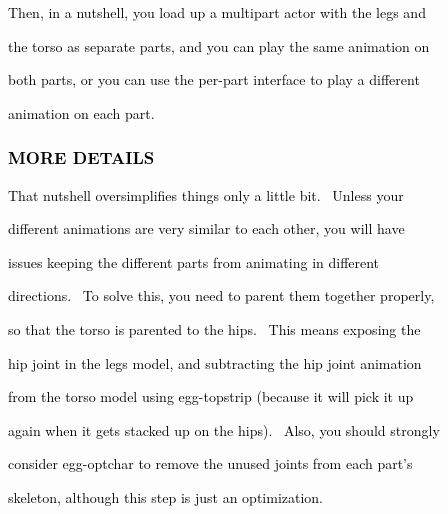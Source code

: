 \documentclass[a4paper]{article}
\newcommand\textstyleOOoComputerKeyWord[1]{\textrm{\textcolor[rgb]{0.0,0.0,0.5019608}{#1}}}
\begin{document}
{\color{black}
\textstyleOOoComputerKeyWord{\textcolor{black}{Then, in a nutshell, you load up a multipart actor with the legs and}}}

{\color{black}
\textstyleOOoComputerKeyWord{\textcolor{black}{the torso as separate parts, and you can play the same animation on}}}

{\color{black}
\textstyleOOoComputerKeyWord{\textcolor{black}{both parts, or you can use the per-part interface to play a different}}}

{\color{black}
\textstyleOOoComputerKeyWord{\textcolor{black}{animation on each part.}}}


\bigskip

\clearpage\subsubsection[MORE DETAILS]{\textstyleOOoComputerKeyWord{\textcolor{black}{MORE DETAILS}}}
\hypertarget{RefHeading7903869075401}{}{\color{black}
\textstyleOOoComputerKeyWord{\textcolor{black}{That nutshell oversimplifies things only a little bit. \ Unless your}}}

{\color{black}
\textstyleOOoComputerKeyWord{\textcolor{black}{different animations are very similar to each other, you will have}}}

{\color{black}
\textstyleOOoComputerKeyWord{\textcolor{black}{issues keeping the different parts from animating in different}}}

{\color{black}
\textstyleOOoComputerKeyWord{\textcolor{black}{directions. \ To solve this, you need to parent them together
properly,}}}

{\color{black}
\textstyleOOoComputerKeyWord{\textcolor{black}{so that the torso is parented to the hips. \ This means exposing the}}}

{\color{black}
\textstyleOOoComputerKeyWord{\textcolor{black}{hip joint in the legs model, and subtracting the hip joint animation}}}

{\color{black}
\textstyleOOoComputerKeyWord{\textcolor{black}{from the torso model using egg-topstrip (because it will pick it up}}}

{\color{black}
\textstyleOOoComputerKeyWord{\textcolor{black}{again when it gets stacked up on the hips). \ Also, you should
strongly}}}

{\color{black}
\textstyleOOoComputerKeyWord{\textcolor{black}{consider egg-optchar to remove the unused joints from each part's}}}

{\color{black}
\textstyleOOoComputerKeyWord{\textcolor{black}{skeleton, although this step is just an optimization.}}}
\end{document}
